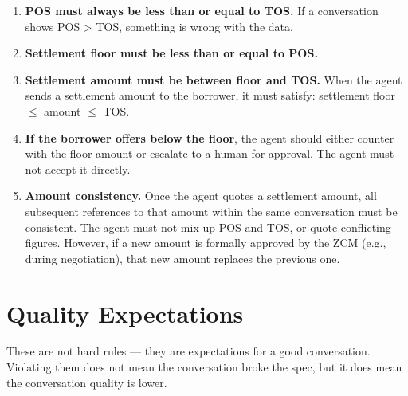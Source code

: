 \documentclass[11pt, a4paper]{article}
\begin{document}
\begin{enumerate}[leftmargin=*, label=\textbf{A\arabic*.}]

\item \textbf{POS must always be less than or equal to TOS.} If a conversation shows POS > TOS, something is wrong with the data.

\item \textbf{Settlement floor must be less than or equal to POS.}

\item \textbf{Settlement amount must be between floor and TOS.} When the agent sends a settlement amount to the borrower, it must satisfy: settlement floor $\leq$ amount $\leq$ TOS.

\item \textbf{If the borrower offers below the floor}, the agent should either counter with the floor amount or escalate to a human for approval. The agent must not accept it directly.

\item \textbf{Amount consistency.} Once the agent quotes a settlement amount, all subsequent references to that amount within the same conversation must be consistent. The agent must not mix up POS and TOS, or quote conflicting figures. However, if a new amount is formally approved by the ZCM (e.g., during negotiation), that new amount replaces the previous one.

\end{enumerate}

\section{Quality Expectations}
\label{sec:quality}

These are not hard rules --- they are expectations for a good conversation. Violating them does not mean the conversation broke the spec, but it does mean the conversation quality is lower.
\end{document}

